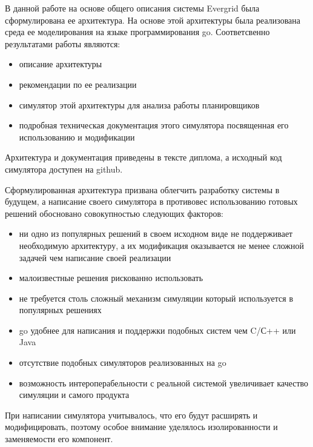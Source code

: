 \conclusion

В данной работе на основе общего описания системы Evergrid была сформулирована ее архитектура. На основе этой архитектуры была реализована среда ее моделирования на языке программирования go. Соответсвенно результатами работы являются:

\begin{itemize}
	\item описание архитектуры
	\item рекомендации по ее реализации
	\item симулятор этой архитектуры для анализа работы планировщиков
	\item подробная техническая документация этого симулятора посвященная его использованию и модификации
\end{itemize}

Архитектура и документация приведены в тексте диплома, а исходный код симулятора доступен на github.

Сформулированная архитектура призвана облегчить разработку системы в будущем, а написание своего симулятора в противовес использованию готовых решений обосновано совокупностью следующих факторов:

\begin{itemize}
	\item ни одно из популярных решений в своем исходном виде не поддерживает необходимую архитектуру, а их модификация оказывается не менее сложной задачей чем написание своей реализации
	\item малоизвестные решения рискованно использовать
	\item не требуется столь сложный механизм симуляции который используется в популярных решениях
	\item go удобнее для написания и поддержки подобных систем чем C/С++ или Java
	\item отсутствие подобных симуляторов реализованных на go
	\item возможность интероперабельности с реальной системой увеличивает качество симуляции и самого продукта
\end{itemize}

При написании симулятора учитывалось, что его будут расширять и модифицировать, поэтому особое внимание уделялось изолированности и заменяемости его компонент.



